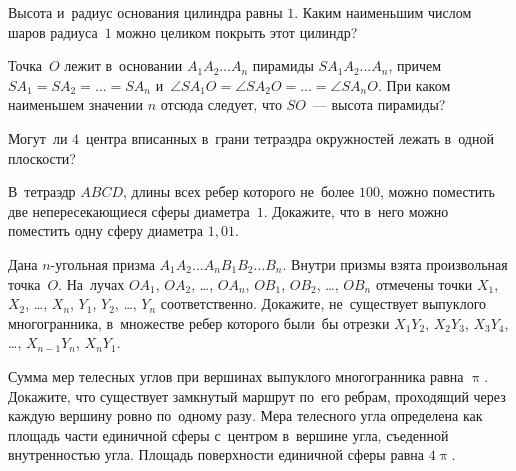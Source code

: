 


\begin{problems}
    \ifdefined\mathup
        \def\piconst{\mathup{\muppi}}%
    \else
        \def\piconst{\uppi}%
    \fi

\item
Высота и~радиус основания цилиндра равны $1$.
Каким наименьшим числом шаров радиуса~$1$ можно целиком покрыть этот цилиндр?

\item
Точка~$O$ лежит в~основании $A_{1}A_{2} \ldots A_{n}$ пирамиды
$SA_{1}A_{2}{\ldots}A_{n}$, причем
\(
    SA_{1} = SA_{2} = \ldots = SA_{n}
\) и~\(
    \angle SA_{1}O = \angle SA_{2}O = \ldots = \angle SA_{n}O
\).
При каком наименьшем значении $n$ отсюда следует, что $SO$~--- высота пирамиды?


\item
Могут~ли $4$~центра вписанных в~грани тетраэдра окружностей лежать в~одной
плоскости?

\item
В~тетраэдр $ABCD$, длины всех ребер которого не~более $100$, можно поместить
две непересекающиеся сферы диаметра~$1$.
Докажите, что в~него можно поместить одну сферу диаметра $1{,}01$.

\item
Дана $n$-угольная призма $A_{1}A_{2}{\ldots}A_{n} B_{1}B_{2}{\ldots}B_{n}$.
Внутри призмы взята произвольная точка~$O$.
На~лучах $OA_{1}$, $OA_{2}$, \ldots, $OA_{n}$,
$OB_{1}$, $OB_{2}$, \ldots, $OB_{n}$ отмечены
точки $X_{1}$, $X_{2}$, \ldots, $X_{n}$, $Y_{1}$, $Y_{2}$, \ldots, $Y_{n}$
соответственно.
Докажите, не~существует выпуклого многогранника, в~множестве ребер которого были~бы отрезки
$X_{1}Y_{2}$, $X_{2}Y_{3}$, $X_{3}Y_{4}$, \ldots, $X_{n-1}Y_{n}$, $X_{n}Y_{1}$.

\item
Сумма мер телесных углов при вершинах выпуклого многогранника равна $\piconst$.
Докажите, что существует замкнутый маршрут по~его ребрам, проходящий через
каждую вершину ровно по~одному разу.
Мера телесного угла определена как площадь части единичной сферы с~центром
в~вершине угла, съеденной внутренностью угла.
Площадь поверхности единичной сферы равна $4 \piconst$.

\end{problems}

